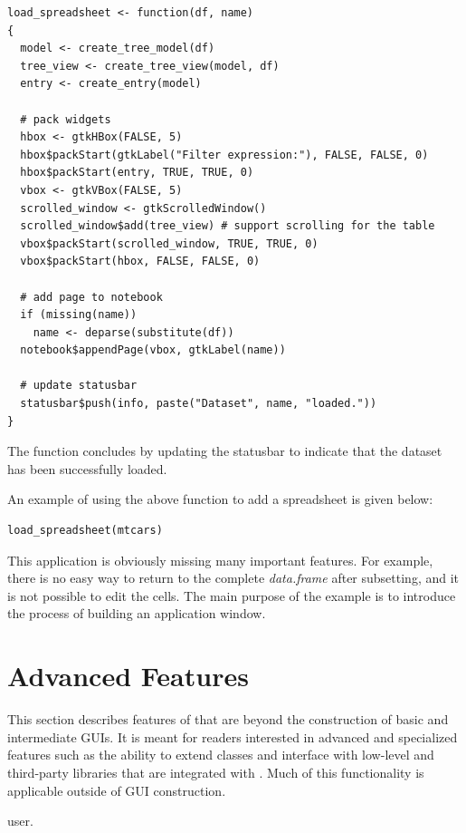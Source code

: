 \documentclass[article]{jss}
\begin{document}
\begin{verbatim}
load_spreadsheet <- function(df, name)
{
  model <- create_tree_model(df)
  tree_view <- create_tree_view(model, df)
  entry <- create_entry(model)

  # pack widgets
  hbox <- gtkHBox(FALSE, 5)
  hbox$packStart(gtkLabel("Filter expression:"), FALSE, FALSE, 0)
  hbox$packStart(entry, TRUE, TRUE, 0)
  vbox <- gtkVBox(FALSE, 5)
  scrolled_window <- gtkScrolledWindow()
  scrolled_window$add(tree_view) # support scrolling for the table
  vbox$packStart(scrolled_window, TRUE, TRUE, 0)
  vbox$packStart(hbox, FALSE, FALSE, 0)

  # add page to notebook  
  if (missing(name))
    name <- deparse(substitute(df))
  notebook$appendPage(vbox, gtkLabel(name))

  # update statusbar
  statusbar$push(info, paste("Dataset", name, "loaded."))
}
\end{verbatim}
The function concludes by updating the statusbar to indicate that the dataset has been successfully loaded.

An example of using the above function to add a spreadsheet is given
below:
\begin{verbatim}
load_spreadsheet(mtcars)
\end{verbatim}

This application is obviously missing many important features. For
example, 
there is no easy way to return to the complete \emph{data.frame} after
subsetting, and
it is not possible to edit the cells. The main purpose of the example
is to
introduce the process of building an application window.

\section{Advanced Features}

This section describes features of  that are beyond the
construction of basic and intermediate GUIs. It is meant for readers
interested in advanced and specialized  features such as
the ability to extend  classes and interface with low-level
and third-party libraries that are integrated with . Much of this functionality is applicable outside of GUI construction.

user.
\end{document}
